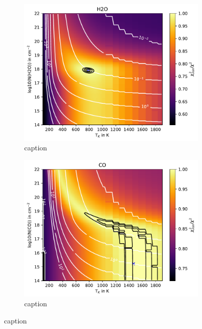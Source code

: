 \documentclass[twoside, single, authoryear, semicolon, 12pt]{lion-msc}
\newcommand{\4}{$_4$}
\newcommand{\3}{$_3$}
\newcommand{\2}{$_2$}
\begin{document}
\begin{figure}[!ht]
    \centering
    \begin{subfigure}[b]{0.49\textwidth}
        \centering
        \includegraphics[width=\textwidth]{radexpy_niels/Radexpy_for_Niels/chi2_map_H2O_Sz98.pdf}
        \caption{caption}
    \end{subfigure}
    \hfill
    \begin{subfigure}[b]{0.49\textwidth}
        \centering
        \includegraphics[width=\textwidth]{radexpy_niels/Radexpy_for_Niels/chi2_map_CO_Sz98.pdf}
        \caption{caption}
    \end{subfigure}
    \caption{caption}
\end{figure}
\end{document}
